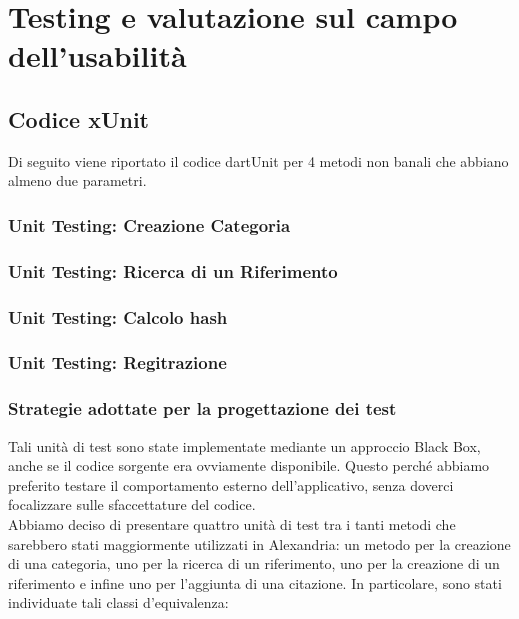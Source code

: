 \chapter{Testing e valutazione sul campo dell'usabilità}
\raggedright{\section{Codice xUnit}}
Di seguito viene riportato il codice dartUnit per 4 metodi non banali che abbiano almeno due parametri.\\

\raggedright{\subsection{Unit Testing: Creazione Categoria}}


\newpage
\raggedright{\subsection{Unit Testing: Ricerca di un Riferimento}}

\newpage
\raggedright{\subsection{Unit Testing: Calcolo hash}}

\raggedright{\subsection{Unit Testing: Regitrazione}}

\newpage
\raggedright{\subsection{Strategie adottate per la progettazione dei test}}
Tali unità di test sono state implementate mediante un approccio Black Box, anche se il codice sorgente era ovviamente disponibile. Questo perché abbiamo preferito testare il comportamento esterno dell'applicativo, senza doverci focalizzare sulle sfaccettature del codice. \\
Abbiamo deciso di presentare quattro unità di test tra i tanti metodi che sarebbero stati maggiormente utilizzati in Alexandria: un metodo per la creazione di una categoria, uno per la ricerca di un riferimento, uno per la creazione di un riferimento e infine uno per l'aggiunta di una citazione. In particolare, sono stati individuate tali classi d'equivalenza:

